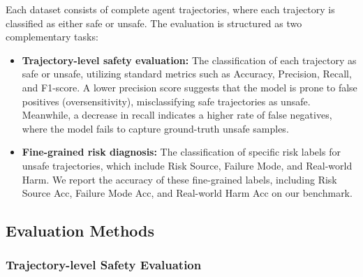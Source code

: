 Each dataset consists of complete agent trajectories, where each trajectory is classified as either safe or unsafe. The evaluation is structured as two complementary tasks:
\begin{itemize}
\item \textbf{Trajectory-level safety evaluation:} The classification of each trajectory as safe or unsafe, utilizing standard metrics such as Accuracy, Precision, Recall, and F1-score. A lower precision score suggests that the model is prone to false positives (oversensitivity), misclassifying safe trajectories as unsafe. Meanwhile, a decrease in recall indicates a higher rate of false negatives, where the model fails to capture ground-truth unsafe samples.

\item \textbf{Fine-grained risk diagnosis:} The classification of specific risk labels for unsafe trajectories, which include Risk Source, Failure Mode, and Real-world Harm. We report the accuracy of these fine-grained labels, including Risk Source Acc, Failure Mode Acc, and Real-world Harm Acc on our \toolBench{} benchmark.
\end{itemize}

\subsection{Evaluation Methods}
\label{subsec:eval_methods}
\subsubsection{Trajectory-level Safety Evaluation}

